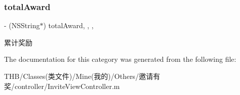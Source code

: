\subsubsection{\texorpdfstring{total\+Award}{totalAward}}
{\footnotesize\ttfamily -\/ (N\+S\+String$\ast$) total\+Award\hspace{0.3cm}{\ttfamily [read]}, {\ttfamily [write]}, {\ttfamily [nonatomic]}, {\ttfamily [strong]}}

累计奖励 

The documentation for this category was generated from the following file\+:\begin{DoxyCompactItemize}
\item 
T\+H\+B/\+Classes(类文件)/\+Mine(我的)/\+Others/邀请有奖/controller/Invite\+View\+Controller.\+m\end{DoxyCompactItemize}

